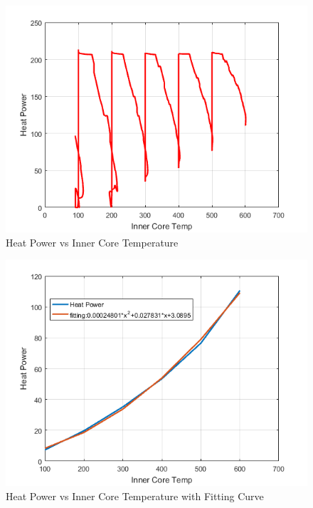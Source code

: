 \documentclass{article}
\begin{document}
\begin{figure}
[h]
\begin{center}
\includegraphics[scale=0.7]{tempvspower.png} 
\caption{Heat Power vs Inner Core Temperature}%
\end{center}
\end{figure}
\begin{figure}
[h]
\begin{center}
\includegraphics[scale=0.7]{08132016heattemp.png} 
\caption{Heat Power vs Inner Core Temperature with Fitting Curve}%
\end{center}
\end{figure}
\end{document}
